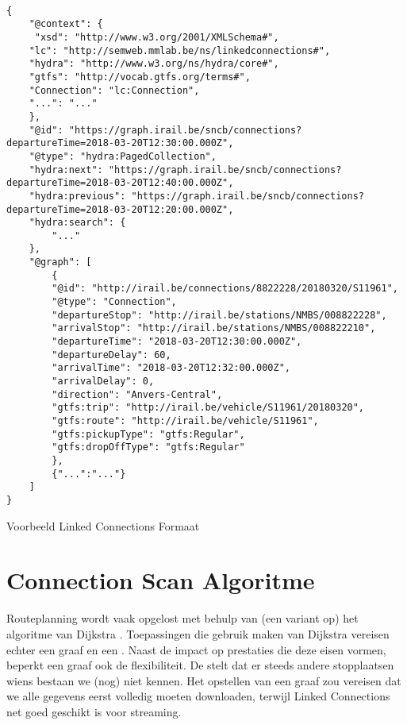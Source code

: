 \begin{code}
	\begin{verbatim}

{
	"@context": {
	 "xsd": "http://www.w3.org/2001/XMLSchema#",
	"lc": "http://semweb.mmlab.be/ns/linkedconnections#",
	"hydra": "http://www.w3.org/ns/hydra/core#",
	"gtfs": "http://vocab.gtfs.org/terms#",
	"Connection": "lc:Connection",
	"...": "..."
	},
	"@id": "https://graph.irail.be/sncb/connections?departureTime=2018-03-20T12:30:00.000Z",
	"@type": "hydra:PagedCollection",
	"hydra:next": "https://graph.irail.be/sncb/connections?departureTime=2018-03-20T12:40:00.000Z",
	"hydra:previous": "https://graph.irail.be/sncb/connections?departureTime=2018-03-20T12:20:00.000Z",
	"hydra:search": {
		"..."
	},
	"@graph": [
		{
		"@id": "http://irail.be/connections/8822228/20180320/S11961",
		"@type": "Connection",
		"departureStop": "http://irail.be/stations/NMBS/008822228",
		"arrivalStop": "http://irail.be/stations/NMBS/008822210",
		"departureTime": "2018-03-20T12:30:00.000Z",
		"departureDelay": 60,
		"arrivalTime": "2018-03-20T12:32:00.000Z",
		"arrivalDelay": 0,
		"direction": "Anvers-Central",
		"gtfs:trip": "http://irail.be/vehicle/S11961/20180320",
		"gtfs:route": "http://irail.be/vehicle/S11961",
		"gtfs:pickupType": "gtfs:Regular",
		"gtfs:dropOffType": "gtfs:Regular"
		},
		{"...":"..."}
	]
}
	\end{verbatim}
\caption{Voorbeeld Linked Connections Formaat}
\label{code:linkedconnections-response}
\end{code}
\section{Connection Scan Algoritme}
Routeplanning wordt vaak opgelost met behulp van (een variant op) het algoritme van Dijkstra \citep{strasser13}. Toepassingen die gebruik maken van Dijkstra vereisen echter een graaf en een . Naast de impact op prestaties die deze eisen vormen, beperkt een graaf ook de flexibiliteit. De  stelt dat er steeds andere stopplaatsen wiens bestaan we (nog) niet kennen. Het opstellen van een graaf zou vereisen dat we alle gegevens eerst volledig moeten downloaden, terwijl Linked Connections net goed geschikt is voor streaming.


